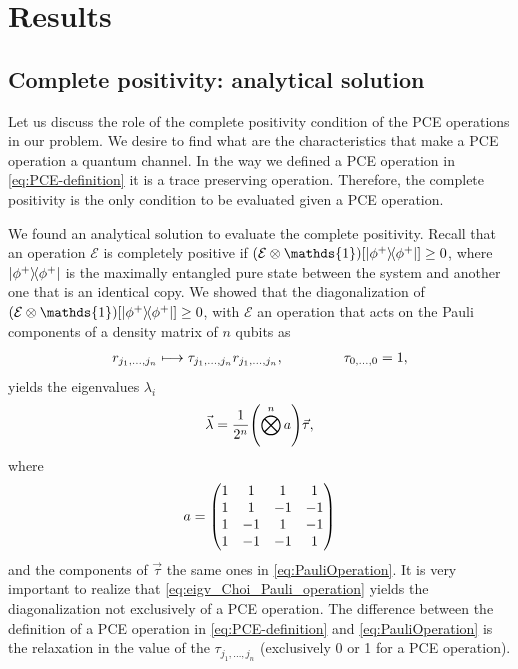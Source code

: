 \documentclass[11pt,dvipsnames]{article} %
\newcommand{\1}{\mathds{1}}
\begin{document}
\section*{Results} %

\subsection*{Complete positivity: analytical solution}
Let us discuss the role of the complete positivity condition of the 
PCE operations in our problem. We desire to find what are the 
characteristics that make a PCE operation a quantum channel.
In the way we defined a PCE operation in \eqref{eq:PCE-definition} it 
is a trace preserving operation. Therefore, the complete positivity is 
the only condition to be evaluated given a PCE operation. 

We found an analytical solution to evaluate the complete positivity.
Recall that an operation $\mathcal{E}$ is completely positive if 
$\qty(\mathcal{E}\otimes\1)\qty[\dyad{\phi^+}{\phi^+}]\geq 0$,
where $\dyad{\phi^+}{\phi^+}$ is the maximally entangled pure 
state between the system and another one that is an identical copy.
We showed that the diagonalization of 
$\qty(\mathcal{E}\otimes\1)\qty[\dyad{\phi^+}{\phi^+}]\geq 0$,
with $\mathcal{E}$ an operation that acts on the Pauli components of
a density matrix of $n$ qubits as
\begin{align} \label{eq:PauliOperation}
r_{j_1,\ldots,j_n}\longmapsto \tau_{j_1,\ldots,j_n}r_{j_1,\ldots,j_n},
\hspace{1.5cm} \tau_{0,\ldots,0}=1,
\end{align}
yields the eigenvalues $\lambda_i$
\begin{align} \label{eq:eigv_Choi_Pauli_operation}
\vec{\lambda}=\frac{1}{2^n}\qty(\bigotimes^na)\vec{\tau},
\end{align}
where 
\begin{align}
a=\mqty(1&1&1&1\\1&1&-1&-1\\1&-1&1&-1\\1&-1&-1&1)
\end{align} 
and the components of $\vec{\tau}$ the same ones in 
\eqref{eq:PauliOperation}. It is very important to realize that 
\eqref{eq:eigv_Choi_Pauli_operation} yields the diagonalization
not exclusively of a PCE operation. The difference between 
the definition of a PCE operation in \eqref{eq:PCE-definition}
and \eqref{eq:PauliOperation} is the relaxation in the value of 
the $\tau_{j_1,\ldots,j_n}$ (exclusively 0 or 1 for a PCE operation). 
\end{document}
